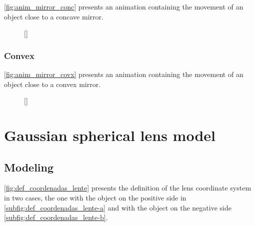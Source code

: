 \documentclass[a4paper,10pt]{article}
\begin{document}
\autoref{fig:anim_mirror_conc} presents an animation containing the movement of an object close to a concave mirror.

\begin{figure}[ht]
  \centering
  [\linewidth]{
  }
\end{figure}

\subsubsection{Convex}

\autoref{fig:anim_mirror_covx} presents an animation containing the movement of an object close to a convex mirror.

\begin{figure}[ht]
  \centering
  [\linewidth]{
  }
\end{figure}

\section{Gaussian spherical lens model}

\subsection{Modeling}

\autoref{fig:def_coordenadas_lente} presents the definition of the lens coordinate system in two cases, the one with the object on the positive side in \autoref{subfig:def_coordenadas_lente-a} and with the object on the negative side \autoref{subfig:def_coordenadas_lente-b}.
\end{document}
